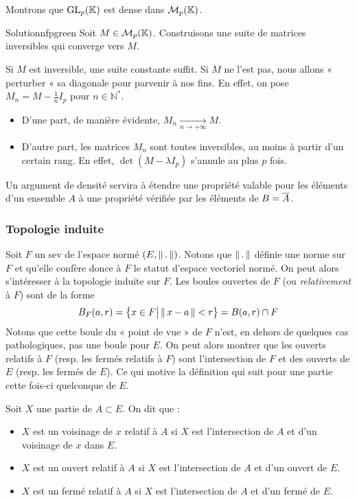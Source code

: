     \begin{exo}{}{}
        Montrons que $\operatorname{GL}_p(\mathbb{K})$ est dense dans $\mathcal{M}_{p}(\mathbb{K})$.
    \end{exo}

    \begin{demo}{Solution}{nfpgreen}
        Soit $M \in \mathcal{M}_{p}(\mathbb{K})$. Construisons une suite de matrices inversibles qui converge vers $M$.
         
        Si $M$ est inversible, une suite constante suffit. Si $M$ ne l’est pas, nous allons « perturber « sa diagonale pour parvenir à nos fins. En effet, on pose $M_n = M - \frac{1}{n} I_p$ pour $n \in \mathbb{N}^*$.
        \begin{itemize}
            \item D’une part, de manière évidente, $M_n \underset{n \rightarrow + \infty}{\longrightarrow} M$.
            \item D’autre part, les matrices $M_n$ sont toutes inversibles, au moins à partir d’un certain rang. En effet, $\det(M-\lambda I_p)$ s’annule au plus $p$ fois.
        \end{itemize}
    \end{demo}

    Un argument de densité servira à étendre une propriété valable pour les éléments d’un ensemble $A$ à une propriété vérifiée par les éléments de $B = \overline{A}$.

    \subsubsection{Topologie induite}

    Soit $F$ un sev de l’espace normé $(E, \left\lVert \,. \, \right\rVert)$. Notons que $\left\lVert \,. \, \right\rVert$ définie une norme sur $F$ et qu’elle confère donce à $F$ le statut d’espace vectoriel normé. On peut alors s’intéresser à la topologie induite sur $F$. Les boules ouvertes de $F$ (ou \textit{relativement} à $F$) sont de la forme 
    \[ B_F(a,r) = \big\{ x \in F \big| \left\lVert \,x - a \, \right\rVert < r \big\} = B(a,r) \cap F \] 
    Notons que cette boule du « point de vue » de $F$ n’est, en dehors de quelques cas pathologiques, pas une boule pour $E$. On peut alors montrer que les ouverts relatifs à $F$ (resp. les fermés relatifs à $F$) sont l’intersection de $F$ et des ouverts de $E$ (resp. les fermés de $E$). Ce qui motive la définition qui suit pour une partie cette fois-ci quelconque de $E$.

    \begin{defi}{}{}
        Soit $X$ une partie de $A \subset E$. On dit que : 
        \begin{itemize}
            \item $X$ est un voisinage de $x$ relatif à $A$ si $X$ est l’intersection de $A$ et d’un voisinage de $x$ dans $E$.
            \item $X$ est un ouvert relatif à $A$ si $X$ est l’intersection de $A$ et d’un ouvert de $E$.
            \item $X$ est un fermé relatif à $A$ si $X$ est l’intersection de $A$ et d’un fermé de $E$.
        \end{itemize}
    \end{defi}

